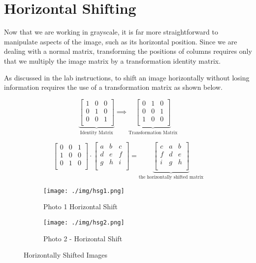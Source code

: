 \section{Horizontal Shifting}

Now that we are working in grayscale, it is far more straightforward to
manipulate aspects of the image, such as its         horizontal position.
Since we are dealing with a normal matrix, transforming the positions of
columns requires only that    we multiply the image matrix by a
transformation identity matrix.

As discussed in the lab instructions, to shift an image horizontally
without
losing information requires the use of a transformation matrix as shown
below.

\[
  \underbrace{
    \begin{bmatrix}
      1&0&0\\
      0&1&0\\
      0&0&1\\
    \end{bmatrix}
  }_{\text{Identity Matrix}}
  \implies
  \underbrace{
    \begin{bmatrix}
      0&1&0\\
      0&0&1\\
      1&0&0\\
    \end{bmatrix}
  }_{\text{Transformation
  Matrix}}
\]

\[ 
  \begin{bmatrix}
    0&0&1\\
    1&0&0\\
    0&1&0\\
  \end{bmatrix}
  \cdot
  \begin{bmatrix}
    a&b&c\\
    d&e&f\\
    g&h&i\\
  \end{bmatrix}
  =
  \underbrace{
    \begin{bmatrix}
      c&a&b\\
      f&d&e\\
      i&g&h\\
    \end{bmatrix}
  }_{\text{the
    horizontally
    shifted
  matrix}}
\]

\begin{figure}[ht]
  \centering
  \begin{subfigure}{\textwidth}
    \centering
    \texttt{[image: ./img/hsg1.png]}
    \caption{Photo
      1
      Horizontal
    Shift}
    \label{fig:p1hg}
  \end{subfigure}
  \begin{subfigure}{\textwidth}
    \centering
    \texttt{[image: ./img/hsg2.png]}
    \caption{Photo
      2
      -
      Horizontal
    Shift}
    \label{fig:p2hg}
  \end{subfigure}
  \caption{Horizontally
    Shifted
  Images}
  \label{fig:hs_images}
\end{figure}

